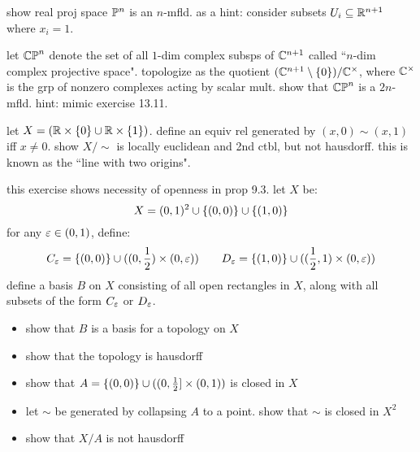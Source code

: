 \newpage
\begin{exr}[source=Primary Source Material]
    show real proj space $\mathbb{P}^{n}$ is an $n$-mfld. as a hint: consider subsets
    $U_{i}\subseteq\mathbb{R}^{n+1}$ where $x_{i}=1$.
\end{exr}

\begin{exr}[source=Primary Source Material]
    let $\mathbb{CP}^{n}$ denote the set of all $1$-dim complex subsps of $\mathbb{C}^{n+1}$
    called ``$n$-dim complex projective space". topologize as the quotient
    $(\mathbb{C}^{n+1}\setminus\left\{{0}\right\})/\mathbb{C}^{\times}$, where $\mathbb{C}^{\times}$ is the grp
    of nonzero complexes acting by scalar mult. show that $\mathbb{CP}^{n}$ is a
    $2n$-mfld. hint: mimic exercise 13.11.
\end{exr}

\begin{exr}[source=Primary Source Material]
    let $X=(\mathbb{R}\times\left\{{0}\right\}\cup\mathbb{R}\times\left\{{1}\right\})$. define an equiv rel generated
    by $(x,0)\sim(x,1)$ iff $x\neq0$. show $X/\sim$ is locally euclidean and 2nd
    ctbl, but not hausdorff. this is known as the ``line with two origins".
\end{exr}

\begin{exr}[source=Primary Source Material]
    this exercise shows necessity of openness in prop 9.3. let $X$ be:
    \begin{equation*}
        X = (0,1)^{2}\cup\left\{{(0,0)}\right\}\cup\left\{{(1,0)}\right\}
    \end{equation*}
    for any $\varepsilon\in(0,1)$, define:
    \begin{equation*}
        C_{\varepsilon}=\left\{{(0,0)}\right\}\cup((0,\frac{1}{2})\times(0,\varepsilon)) \qquad
        D_{\varepsilon}=\left\{{(1,0)}\right\}\cup((\frac{1}{2},1)\times(0,\varepsilon))
    \end{equation*}
    define a basis $B$ on $X$ consisting of all open rectangles in $X$, along
    with all subsets of the form $C_{\varepsilon}$ or $D_{\varepsilon}$.
    \begin{itemize}
        \item show that $B$ is a basis for a topology on $X$
        \item show that the topology is hausdorff
        \item show that $A=\left\{{(0,0)}\right\}\cup((0,\frac{1}{2}]\times(0,1))$ is closed
            in $X$
        \item let $\sim$ be generated by collapsing $A$ to a point. show that
            $\sim$ is closed in $X^{2}$
        \item show that $X/A$ is not hausdorff
    \end{itemize}
\end{exr}

